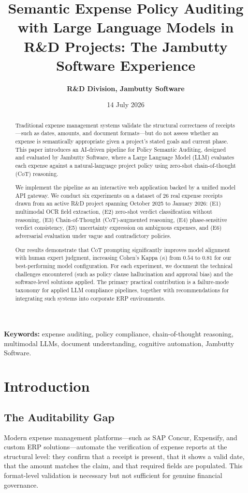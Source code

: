\documentclass[11pt,a4paper]{article}
\title{\textbf{Semantic Expense Policy Auditing with Large Language Models in R&D Projects: The Jambutty Software Experience}}
\author{\textbf{R\&D Division, Jambutty Software}}
\date{14 July 2026}
\begin{document}
\maketitle

\begin{abstract}
Traditional expense management systems validate the structural correctness of receipts---such as dates, amounts, and document formats---but do not assess whether an expense is semantically appropriate given a project's stated goals and current phase. This paper introduces an AI-driven pipeline for Policy Semantic Auditing, designed and evaluated by Jambutty Software, where a Large Language Model (LLM) evaluates each expense against a natural-language project policy using zero-shot chain-of-thought (CoT) reasoning.

We implement the pipeline as an interactive web application backed by a unified model API gateway. We conduct six experiments on a dataset of 26 real expense receipts drawn from an active R\&D project spanning October 2025 to January 2026: (E1) multimodal OCR field extraction, (E2) zero-shot verdict classification without reasoning, (E3) Chain-of-Thought (CoT)-augmented reasoning, (E4) phase-sensitive verdict consistency, (E5) uncertainty expression on ambiguous expenses, and (E6) adversarial evaluation under vague and contradictory policies.

Our results demonstrate that CoT prompting significantly improves model alignment with human expert judgment, increasing Cohen's Kappa ($\kappa$) from $0.54$ to $0.81$ for our best-performing model configuration. For each experiment, we document the technical challenges encountered (such as policy clause hallucination and approval bias) and the software-level solutions applied. The primary practical contribution is a failure-mode taxonomy for applied LLM compliance pipelines, together with recommendations for integrating such systems into corporate ERP environments.
\end{abstract}

\textbf{Keywords:} expense auditing, policy compliance, chain-of-thought reasoning, multimodal LLMs, document understanding, cognitive automation, Jambutty Software.

\newpage

\section{Introduction}

\subsection{The Auditability Gap}
Modern expense management platforms---such as SAP Concur, Expensify, and custom ERP solutions---automate the verification of expense reports at the structural level: they confirm that a receipt is present, that it shows a valid date, that the amount matches the claim, and that required fields are populated. This format-level validation is necessary but not sufficient for genuine financial governance.
\end{document}
